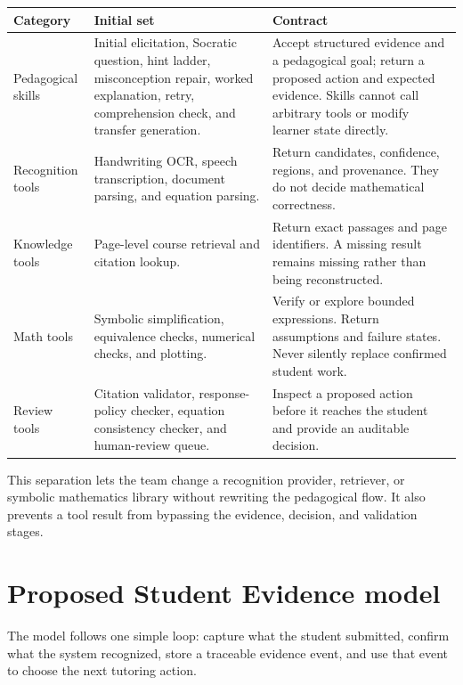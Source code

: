 \documentclass[11pt]{article}
\begin{document}
\noindent\begin{tabularx}{\textwidth}{@{}p{}p{}X@{}}
\toprule
\textbf{Category} & \textbf{Initial set} & \textbf{Contract} \\
\midrule
Pedagogical skills & Initial elicitation, Socratic question, hint ladder, misconception repair, worked explanation, retry, comprehension check, and transfer generation. & Accept structured evidence and a pedagogical goal; return a proposed action and expected evidence. Skills cannot call arbitrary tools or modify learner state directly. \\
Recognition tools & Handwriting OCR, speech transcription, document parsing, and equation parsing. & Return candidates, confidence, regions, and provenance. They do not decide mathematical correctness. \\
Knowledge tools & Page-level course retrieval and citation lookup. & Return exact passages and page identifiers. A missing result remains missing rather than being reconstructed. \\
Math tools & Symbolic simplification, equivalence checks, numerical checks, and plotting. & Verify or explore bounded expressions. Return assumptions and failure states. Never silently replace confirmed student work. \\
Review tools & Citation validator, response-policy checker, equation consistency checker, and human-review queue. & Inspect a proposed action before it reaches the student and provide an auditable decision. \\
\bottomrule
\end{tabularx}

This separation lets the team change a recognition provider, retriever, or symbolic mathematics library without rewriting the pedagogical flow. It also prevents a tool result from bypassing the evidence, decision, and validation stages.

\clearpage
\section{Proposed Student Evidence model}

The model follows one simple loop: capture what the student submitted, confirm what the system recognized, store a traceable evidence event, and use that event to choose the next tutoring action.
\end{document}
